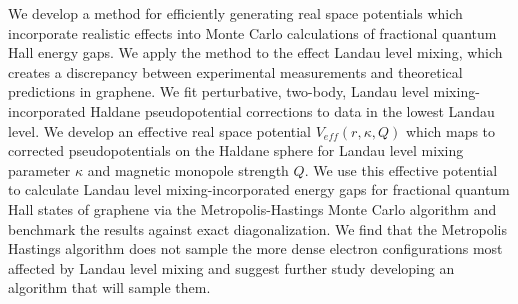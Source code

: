 \doublespacing

We develop a method for efficiently generating real space potentials which incorporate realistic effects into Monte Carlo calculations of fractional quantum Hall energy gaps. We apply the method to the effect Landau level mixing, which creates a discrepancy between experimental measurements and theoretical predictions in graphene. We fit perturbative, two-body, Landau level mixing-incorporated Haldane pseudopotential corrections to data in the lowest Landau level. We develop an effective real space potential $V_{eff}(r,\kappa,Q)$ which maps to corrected pseudopotentials on the Haldane sphere for Landau level mixing parameter $\kappa$ and magnetic monopole strength $Q$. We use this effective potential to calculate Landau level mixing-incorporated energy gaps for fractional quantum Hall states of graphene via the Metropolis-Hastings Monte Carlo algorithm and benchmark the results against exact diagonalization. We find that the Metropolis Hastings algorithm does not sample the more dense electron configurations most affected by Landau level mixing and suggest further study developing an algorithm that will sample them.

\singlespacing